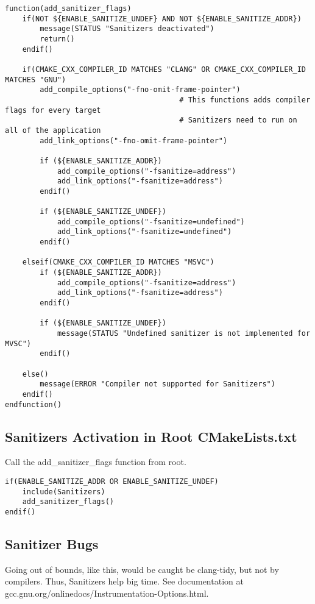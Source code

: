 \begin{verbatim}
function(add_sanitizer_flags)
    if(NOT ${ENABLE_SANITIZE_UNDEF} AND NOT ${ENABLE_SANITIZE_ADDR})
        message(STATUS "Sanitizers deactivated") 
        return()
    endif()

    if(CMAKE_CXX_COMPILER_ID MATCHES "CLANG" OR CMAKE_CXX_COMPILER_ID MATCHES "GNU")
        add_compile_options("-fno-omit-frame-pointer")   
                                        # This functions adds compiler flags for every target
                                        # Sanitizers need to run on all of the application
        add_link_options("-fno-omit-frame-pointer")

        if (${ENABLE_SANITIZE_ADDR})
            add_compile_options("-fsanitize=address") 
            add_link_options("-fsanitize=address") 
        endif()

        if (${ENABLE_SANITIZE_UNDEF})
            add_compile_options("-fsanitize=undefined") 
            add_link_options("-fsanitize=undefined") 
        endif()

    elseif(CMAKE_CXX_COMPILER_ID MATCHES "MSVC")
        if (${ENABLE_SANITIZE_ADDR})
            add_compile_options("-fsanitize=address") 
            add_link_options("-fsanitize=address") 
        endif()

        if (${ENABLE_SANITIZE_UNDEF})
            message(STATUS "Undefined sanitizer is not implemented for MVSC")
        endif()

    else() 
        message(ERROR "Compiler not supported for Sanitizers")
    endif()
endfunction()
\end{verbatim}


\subsection{Sanitizers Activation in Root CMakeLists.txt}

Call the add\_sanitizer\_flags function from root.

\begin{verbatim}
if(ENABLE_SANITIZE_ADDR OR ENABLE_SANITIZE_UNDEF)
    include(Sanitizers)
    add_sanitizer_flags()
endif()
\end{verbatim}

\subsection{Sanitizer Bugs}

Going out of bounds, like this, would be caught be clang-tidy, but not by compilers. Thus, Sanitizers help big time. See documentation at
gcc.gnu.org/onlinedocs/Instrumentation-Options.html.


